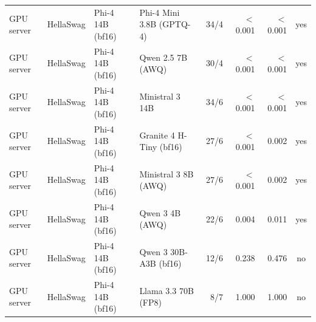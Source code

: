 \begin{longtable}{@{}l l l l r r r c@{}}
GPU server & HellaSwag & Phi-4 14B (bf16) & Phi-4 Mini 3.8B (GPTQ-4) & 34/4 & $<$0.001 & $<$0.001 & yes \\
GPU server & HellaSwag & Phi-4 14B (bf16) & Qwen 2.5 7B (AWQ) & 30/4 & $<$0.001 & $<$0.001 & yes \\
GPU server & HellaSwag & Phi-4 14B (bf16) & Ministral 3 14B & 34/6 & $<$0.001 & $<$0.001 & yes \\
GPU server & HellaSwag & Phi-4 14B (bf16) & Granite 4 H-Tiny (bf16) & 27/6 & $<$0.001 & 0.002 & yes \\
GPU server & HellaSwag & Phi-4 14B (bf16) & Ministral 3 8B (AWQ) & 27/6 & $<$0.001 & 0.002 & yes \\
GPU server & HellaSwag & Phi-4 14B (bf16) & Qwen 3 4B (AWQ) & 22/6 & 0.004 & 0.011 & yes \\
GPU server & HellaSwag & Phi-4 14B (bf16) & Qwen 3 30B-A3B (bf16) & 12/6 & 0.238 & 0.476 & no \\
GPU server & HellaSwag & Phi-4 14B (bf16) & Llama 3.3 70B (FP8) & 8/7 & 1.000 & 1.000 & no \\
\end{longtable}
